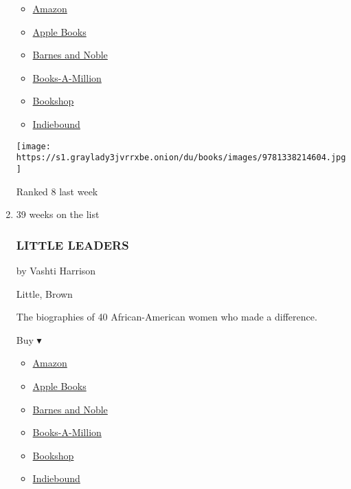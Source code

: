 \begin{enumerate}
  \begin{itemize}
  \tightlist
  \item
    \href{https://www.amazon.com/dp/1338214608?tag=NYTBSREV-20\&tag=NYTBS-20}{Amazon}
  \item
    \href{https://du-gae-books-dot-nyt-du-prd.appspot.com/buy?title=WINGS+OF+FIRE\%3A+LEGENDS\%3A+DRAGONSLAYER\&author=Tui+T+Sutherland}{Apple
    Books}
  \item
    \href{https://www.anrdoezrs.net/click-7990613-11819508?url=https\%3A\%2F\%2Fwww.barnesandnoble.com\%2Fw\%2F\%3Fean\%3D9781338214604}{Barnes
    and Noble}
  \item
    \href{https://www.anrdoezrs.net/click-7990613-35140?url=https\%3A\%2F\%2Fwww.booksamillion.com\%2Fp\%2FWINGS\%2BOF\%2BFIRE\%253A\%2BLEGENDS\%253A\%2BDRAGONSLAYER\%2FTui\%2BT\%2BSutherland\%2F9781338214604}{Books-A-Million}
  \item
    \href{https://bookshop.org/a/3546/9781338214604}{Bookshop}
  \item
    \href{https://www.indiebound.org/book/9781338214604?aff=NYT}{Indiebound}
  \end{itemize}

  \texttt{[image: https://s1.graylady3jvrrxbe.onion/du/books/images/9781338214604.jpg]}

  Ranked 8 last week
\item
  39 weeks on the list

  \hypertarget{little-leaders}{%
  \subsubsection{LITTLE LEADERS}\label{little-leaders}}

  by Vashti Harrison

  Little, Brown

  The biographies of 40 African-American women who made a difference.

  Buy ▾

  \begin{itemize}
  \tightlist
  \item
    \href{https://www.amazon.com/Little-Leaders-Women-Black-History/dp/0316475114?tag=NYTBS-20}{Amazon}
  \item
    \href{https://du-gae-books-dot-nyt-du-prd.appspot.com/buy?title=LITTLE+LEADERS\&author=Vashti+Harrison}{Apple
    Books}
  \item
    \href{https://www.anrdoezrs.net/click-7990613-11819508?url=https\%3A\%2F\%2Fwww.barnesandnoble.com\%2Fw\%2F\%3Fean\%3D9780316475112}{Barnes
    and Noble}
  \item
    \href{https://www.anrdoezrs.net/click-7990613-35140?url=https\%3A\%2F\%2Fwww.booksamillion.com\%2Fp\%2FLITTLE\%2BLEADERS\%2FVashti\%2BHarrison\%2F9780316475112}{Books-A-Million}
  \item
    \href{https://bookshop.org/a/3546/9780316475112}{Bookshop}
  \item
    \href{https://www.indiebound.org/book/9780316475112?aff=NYT}{Indiebound}
  \end{itemize}


\end{enumerate}
